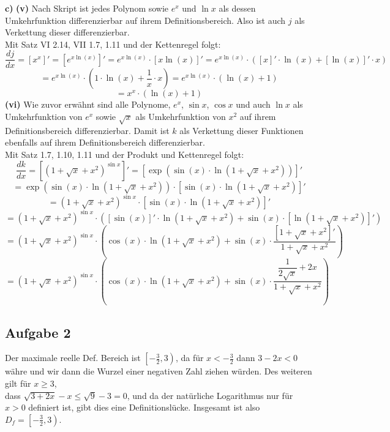 \documentclass[a4paper,graphics,11pt]{article}
\newcommand{\aufgabe}[1]{\subsection*{Aufgabe #1}}
\begin{document}
\textbf{c)}
\textbf{(v)}
Nach Skript ist jedes Polynom sowie $e^x$ und $\ln x$ als dessen Umkehrfunktion differenzierbar auf ihrem
Definitionsbereich. Also ist auch $j$ als Verkettung dieser differenzierbar.\\
Mit Satz VI 2.14, VII 1.7, 1.11 und der Kettenregel folgt:
$$
    \frac{dj}{dx} = [x^x]' = \left[e^{x\ln(x)}\right]'
    = e^{x\ln(x)} \cdot [x\ln(x)]'
    = e^{x\ln(x)} \cdot ([x]' \cdot \ln(x) + [\ln(x)]' \cdot x)
$$$$
    = e^{x\ln(x)} \cdot (1 \cdot \ln(x) + \frac{1}{x} \cdot x)
    = e^{x\ln(x)} \cdot (\ln(x) + 1)
$$$$
    = x^x \cdot (\ln(x) + 1)
$$
\newpage
\textbf{(vi)}
Wie zuvor erwähnt sind alle Polynome, $e^x$, $\sin x$, $\cos x$ und auch $\ln x$ als Umkehrfunktion von $e^x$
sowie $\sqrt{x}$ als Umkehrfunktion von $x^2$ auf ihrem Definitionsbereich differenzierbar.
Damit ist $k$ als Verkettung dieser Funktionen ebenfalls auf ihrem Definitionsbereich differenzierbar.\\
Mit Satz 1.7, 1.10, 1.11 und der Produkt und Kettenregel folgt:
$$
    \frac{dk}{dx} = \left[\left(1 + \sqrt{x} + x^2\right)^{\sin x}\right]'
    = \left[\exp\left(\sin(x)\cdot \ln\left(1 + \sqrt{x} + x^2\right)\right) \right]'
$$$$
    = \exp\left(\sin(x)\cdot \ln\left(1 + \sqrt{x} + x^2\right)\right)
        \cdot \left[\sin(x)\cdot \ln\left(1 + \sqrt{x} + x^2\right)\right]'
$$$$
    = \left(1+\sqrt{x} + x^2\right)^{\sin x}
        \cdot \left[\sin(x)\cdot \ln\left(1 + \sqrt{x} + x^2\right)\right]'
$$$$
    = \left(1+\sqrt{x} + x^2\right)^{\sin x}
        \cdot \left([\sin(x)]'\cdot \ln\left(1 + \sqrt{x} + x^2\right)
        + \sin(x) \cdot \left[\ln\left(1+\sqrt{x} + x^2\right)\right]'\right)
$$$$
    = \left(1+\sqrt{x} + x^2\right)^{\sin x}
        \cdot \left(\cos(x)\cdot \ln\left(1 + \sqrt{x} + x^2\right)
        + \sin(x) \cdot \frac{[1+\sqrt{x}+x^2]'}{1+\sqrt{x} + x^2}\right)
$$$$
    = \left(1+\sqrt{x} + x^2\right)^{\sin x}
        \cdot \left(\cos(x)\cdot \ln\left(1 + \sqrt{x} + x^2\right)
        + \sin(x) \cdot \frac{\dfrac{1}{2\sqrt{x}}+2x}{1+\sqrt{x} + x^2}\right)
$$

\aufgabe{2}
Der maximale reelle Def. Bereich ist $\left[-\frac{3}{2} , 3\right)$, da für $x < - \frac{3}{2}$ dann
$3 - 2x < 0$ währe und wir dann die Wurzel einer negativen Zahl ziehen würden.
Des weiteren gilt für $x \geq 3$,\\ dass $\sqrt{3+2x} - x \leq \sqrt{9} - 3= 0$, und da
der natürliche Logarithmus nur für $x > 0$ definiert ist, gibt dies eine Definitionslücke.
Insgesamt ist also $D_f = \left[-\frac{3}{2}, 3\right)$.
\end{document}
